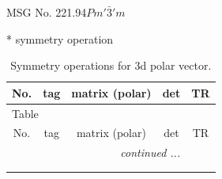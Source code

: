 \documentclass[fleqn,8pt]{jsarticle}
\begin{document}
\setcounter{MaxMatrixCols}{32}

\renewcommand{\tablename}{Table~}
\renewcommand{\figurename}{Figure~}
\begin{center}
\LARGE
MSG No. 221.94\quad$Pm'\bar{3}'m$
\end{center}
* symmetry operation
\renewcommand{\arraystretch}{1.3}
\begin{longtable}{ccccc}
\caption{Symmetry operations for 3d polar vector.}
 \\
 \hline \hline
No. & tag & matrix (polar) & det & TR \\ \hline \endfirsthead

\multicolumn{4}{l}{\tablename\ \thetable{}} \\
 \hline \hline
No. & tag & matrix (polar) & det & TR \\ \hline \endhead

 \hline \hline
\multicolumn{4}{r}{\footnotesize\it continued ...} \\ \endfoot

 \hline \hline
\multicolumn{4}{r}{} \\ \endlastfoot


\end{longtable}
\end{document}
